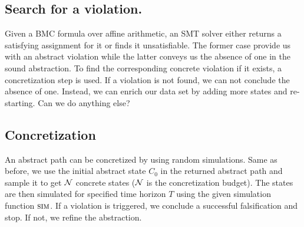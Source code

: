 \subsection{Search for a violation.} Given a BMC formula over affine
arithmetic, an SMT solver either returns a satisfying assignment for
it or finds it unsatisfiable. The former case provide us with an
abstract violation while the latter conveys us the absence of one in
the sound abstraction. To find the corresponding concrete violation if
it exists, a concretization step is used. If a violation is not found,
we can not conclude the absence of one. Instead, we can enrich our
data set by adding more states and re-starting. Can we do anything
else?

\subsection{Concretization} An abstract path can be concretized by
using random simulations. Same as before, we use the initial abstract
state $C_0$ in the returned abstract path and sample it to get
$\mathcal{N}$ concrete states ($\mathcal{N}$ is the concretization budget).
The states are then simulated for specified time horizon $T$ using the
given simulation function $\mbox{\sc sim}$. If a violation is triggered, we
conclude a successful falsification and stop. If not, we refine the
abstraction.
